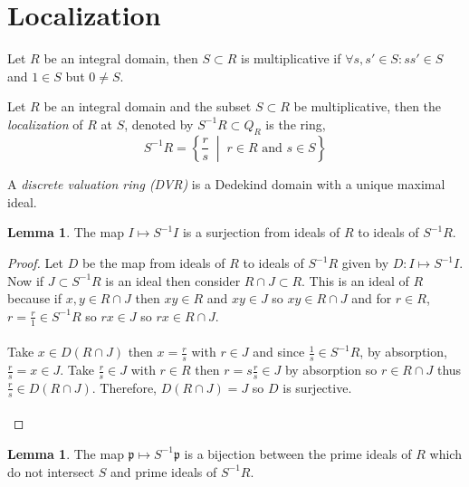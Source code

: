 \documentclass[12pt]{extarticle}
\theoremstyle{definition}
\newtheorem{lemma}[theorem]{Lemma}
\newenvironment{definition}[1][Definition:]{\begin{trivlist}
\item[\hskip \labelsep {\bfseries #1}]}{\end{trivlist}}
\begin{document}
\section{Localization}

\begin{definition}
Let $R$ be an integral domain, then $S \subset R$ is multiplicative if $\forall s, s' \in S : s s' \in S$ and $1 \in S$ but $0 \neq S$. 
\end{definition}

\begin{definition}
Let $R$ be an integral domain and the subset $S \subset R$ be multiplicative, then the \textit{localization} of $R$ at $S$, denoted by $S^{-1} R \subset Q_R$ is the ring,
\[ S^{-1} R = \left\{ \frac{r}{s} \; \middle| \; r \in R \text{ and } s \in S \right \} \]  
\end{definition}

\begin{definition}
A \textit{discrete valuation ring (DVR)} is a Dedekind domain with a unique maximal ideal. 
\end{definition}

\begin{lemma} \label{idealsurj}
The map $I \mapsto S^{-1} I$ is a surjection from ideals of $R$ to ideals of $S^{-1} R$. 
\end{lemma}

\begin{proof}
Let $D$ be the map from ideals of $R$ to ideals of $S^{-1}R$ given by $D : I \mapsto S^{-1} I$. Now if $J \subset S^{-1}R$ is an ideal then consider $R \cap J \subset R$. This is an ideal of $R$ because if $x,y \in R \cap J$ then $xy \in R$ and $xy \in J$ so $xy \in R \cap J$ and for $r \in R$, $r = \frac{r}{1} \in S^{-1} R$ so $rx \in J$ so $rx \in R \cap J$. \\ \\
Take $x \in D(R \cap J)$ then $x = \frac{r}{s}$ with $r \in J$ and since $\frac{1}{s} \in S^{-1}R$, by absorption, $\frac{r}{s} = x \in J$. Take $\frac{r}{s} \in J$ with $r \in R$ then $r = s \frac{r}{s} \in J$ by absorption so $r \in R \cap J$ thus $\frac{r}{s} \in D(R \cap J)$. Therefore, $D(R \cap J) = J$ so $D$ is surjective.  \\ \\
\end{proof}


\begin{lemma} \label{idealbij}
The map $\mathfrak{p} \mapsto S^{-1} \mathfrak{p}$ is a bijection between the prime ideals of $R$ which do not intersect $S$ and prime ideals of $S^{-1} R$. 
\end{lemma}
\end{document}
